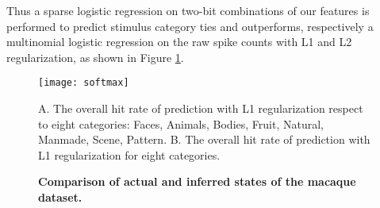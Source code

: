 \documentclass[10pt,letterpaper]{article}
\begin{document}
Thus a sparse logistic regression on two-bit combinations of our features is performed to predict stimulus category ties and outperforms, respectively a multinomial logistic regression on the raw spike counts with L1 and L2 regularization, as shown in Figure \ref{fig:softmax}.

\begin{figure}[!ht]
    \texttt{[image: softmax]}
	\caption{\bf Comparison of actual and inferred states of the macaque dataset.}
    A. The overall hit rate of prediction with L1 regularization respect to eight categories: Faces, Animals, Bodies, Fruit, Natural, Manmade, Scene, Pattern. B. The overall hit rate of prediction with L1 regularization for eight categories.
	\label{fig:softmax}
\end{figure}
\end{document}

